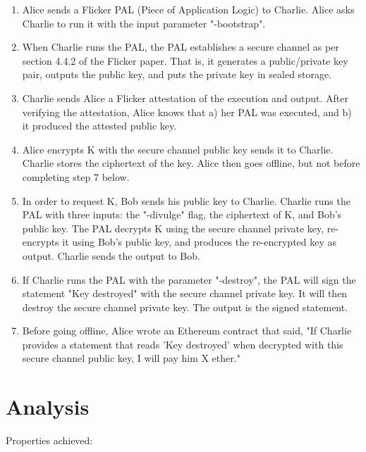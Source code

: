 \documentclass{article}
\begin{document}
\begin{enumerate}

\item Alice sends a Flicker PAL (Piece of Application Logic) to Charlie. Alice asks Charlie to run it with the input parameter "-bootstrap".

\item When Charlie runs the PAL, the PAL establishes a secure channel as per section 4.4.2 of the Flicker paper. That is, it generates a public/private key pair, outputs the public key, and puts the private key in sealed storage.

\item Charlie sends Alice a Flicker attestation of the execution and output. After verifying the attestation, Alice knows that a) her PAL was executed, and b) it produced the attested public key.

\item Alice encrypts K with the secure channel public key sends it to Charlie. Charlie stores the ciphertext of the key. Alice then goes offline, but not before completing step 7 below.

\item In order to request K, Bob sends his public key to Charlie. Charlie runs the PAL with three inputs: the "-divulge" flag, the ciphertext of K, and Bob's public key. The PAL decrypts K using the secure channel private key, re-encrypts it using Bob's public key, and produces the re-encrypted key as output. Charlie sends the output to Bob.

\item If Charlie runs the PAL with the parameter "-destroy", the PAL will sign the statement "Key destroyed" with the secure channel private key. It will then destroy the secure channel private key. The output is the signed statement.

\item Before going offline, Alice wrote an Ethereum contract that said, "If Charlie provides a statement that reads 'Key destroyed' when decrypted with this secure channel public key, I will pay him X ether."

\end{enumerate}

\section{Analysis}

Properties achieved:
\end{document}
